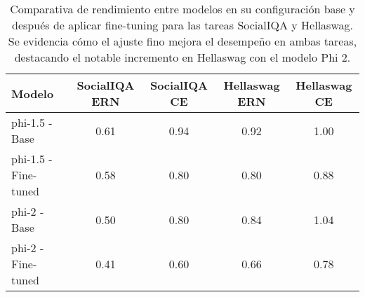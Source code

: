 \begin{table}[ht!]
\caption{Comparativa de rendimiento entre modelos en su configuración base y después de aplicar fine-tuning para las tareas SocialIQA y Hellaswag. Se evidencia cómo el ajuste fino mejora el desempeño en ambas tareas, destacando el notable incremento en Hellaswag con el modelo Phi 2.}
\label{tab:performance_comparison_TEN_y_ECN}
\begin{tabular}{lcccc}
\toprule
Modelo & SocialIQA ERN & SocialIQA CE & Hellaswag ERN & Hellaswag CE \\
\midrule
phi-1.5 - Base & 0.61 & 0.94 & 0.92 & 1.00 \\
phi-1.5 - Fine-tuned & 0.58 & 0.80 & 0.80 & 0.88 \\
phi-2 - Base & 0.50 & 0.80 & 0.84 & 1.04 \\
phi-2 - Fine-tuned & 0.41 & 0.60 & 0.66 & 0.78 \\
\bottomrule
\end{tabular}
\end{table}
